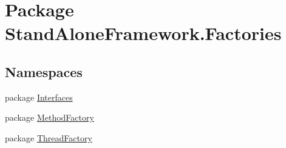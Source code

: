 \hypertarget{namespace_stand_alone_framework_1_1_factories}{\section{Package Stand\+Alone\+Framework.\+Factories}
\label{namespace_stand_alone_framework_1_1_factories}
}
\subsection*{Namespaces}
\begin{DoxyCompactItemize}
\item 
package \hyperlink{namespace_stand_alone_framework_1_1_factories_1_1_interfaces}{Interfaces}
\item 
package \hyperlink{namespace_stand_alone_framework_1_1_factories_1_1_method_factory}{Method\+Factory}
\item 
package \hyperlink{namespace_stand_alone_framework_1_1_factories_1_1_thread_factory}{Thread\+Factory}
\end{DoxyCompactItemize}
